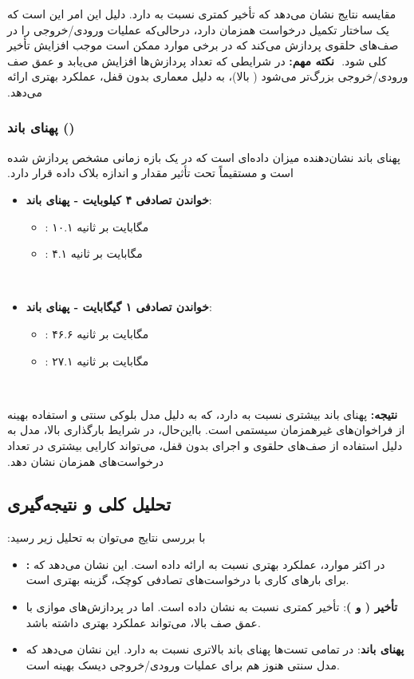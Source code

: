 ‫
‫مقایسه نتایج نشان می‌دهد که  تأخیر کمتری نسبت به  دارد. دلیل این امر این است که  یک ساختار تکمیل درخواست همزمان دارد، درحالی‌که  عملیات ورودی/خروجی را در صف‌های حلقوی پردازش می‌کند که در برخی موارد ممکن است موجب افزایش تأخیر کلی شود.
‫
‫\textbf{نکته مهم:} در شرایطی که تعداد پردازش‌ها افزایش می‌یابد و عمق صف ورودی/خروجی بزرگ‌تر می‌شود ( بالا)،  به دلیل معماری بدون قفل، عملکرد بهتری ارائه می‌دهد.
‫
‫\subsubsection*{پهنای باند ()}
‫
‫پهنای باند نشان‌دهنده میزان داده‌ای است که در یک بازه زمانی مشخص پردازش شده است و مستقیماً تحت تأثیر مقدار  و اندازه بلاک داده قرار دارد.
‫
‫\begin{itemize}
‫	\item \textbf{خواندن تصادفی ۴ کیلوبایت - پهنای باند}:
‫	\begin{itemize}
‫		\item {}: ۱۰.۱ مگابایت بر ثانیه
‫		\item {}: ۴.۱ مگابایت بر ثانیه
‫	\end{itemize}
‫	\item \textbf{خواندن تصادفی ۱ گیگابایت - پهنای باند}:
‫	\begin{itemize}
‫		\item {}: ۴۶.۶ مگابایت بر ثانیه
‫		\item {}: ۲۷.۱ مگابایت بر ثانیه
‫	\end{itemize}
‫\end{itemize}
‫
‫\textbf{نتیجه:}  پهنای باند بیشتری نسبت به  دارد، که به دلیل مدل بلوکی سنتی  و استفاده بهینه از فراخوان‌های غیرهمزمان سیستمی است. بااین‌حال، در شرایط بارگذاری بالا، مدل  به دلیل استفاده از صف‌های حلقوی و اجرای بدون قفل، می‌تواند کارایی بیشتری در تعداد درخواست‌های همزمان نشان دهد.
‫
‫\subsection*{تحلیل کلی و نتیجه‌گیری}
‫
‫با بررسی نتایج می‌توان به تحلیل زیر رسید:
‫
‫\begin{itemize}
‫	\item \textbf{:} در اکثر موارد،  عملکرد بهتری نسبت به  ارائه داده است. این نشان می‌دهد که برای بارهای کاری با درخواست‌های تصادفی کوچک،  گزینه بهتری است.
‫	\item \textbf{تأخیر ( و )}:  تأخیر کمتری نسبت به  نشان داده است. اما در پردازش‌های موازی با عمق صف بالا،  می‌تواند عملکرد بهتری داشته باشد.
‫	\item \textbf{پهنای باند}:  در تمامی تست‌ها پهنای باند بالاتری نسبت به  دارد. این نشان می‌دهد که مدل سنتی  هنوز هم برای عملیات ورودی/خروجی دیسک بهینه است.
‫\end{itemize}
